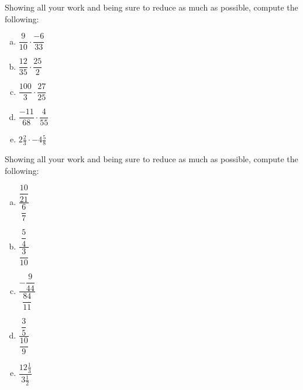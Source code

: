 \documentclass[11pt,letterpaper]{article}
\begin{document}
\newpage



 Showing all your work and being sure to reduce as much as possible, compute the following:
\begin{enumerate}[(a)]
\item $\dfrac{9}{10} \cdot \dfrac{-6}{33}$
\item $\dfrac{12}{35} \cdot \dfrac{25}{2}$
\item $\dfrac{100}{3} \cdot \dfrac{27}{25}$
\item $\dfrac{-11}{68} \cdot \dfrac{4}{55}$
\item $2 \frac{2}{3} \cdot -4 \frac{5}{8}$
\end{enumerate}



\newpage



 Showing all your work and being sure to reduce as much as possible, compute the following:
\begin{enumerate}[(a)]
\item $\dfrac{\dfrac{10}{21}}{\dfrac{6}{7}}$
\item $\dfrac{\dfrac{5}{4}}{\dfrac{3}{10}}$
\item $\dfrac{-\dfrac{9}{44}}{\dfrac{84}{11}}$
\item $\dfrac{\dfrac{3}{5}}{\dfrac{10}{9}}$
\item $\dfrac{12\frac{1}{3}}{3\frac{1}{2}}$
\end{enumerate}
\end{document}
